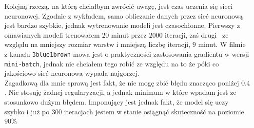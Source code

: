 \documentclass[polish,12pt,a4paper]{extarticle}
\begin{document}
Kolejną rzeczą, na którą chciałbym zwrócić uwagę, jest czas uczenia się sieci neuronowej. Zgodnie z wykładem, samo obliczanie danych przez sieć neuronową jest bardzo szybkie, jednak wytrenowanie modeli jest czasochłonne. Pierwszy z omawianych modeli trenowałem $20$ minut przez $2000$ iteracji, zaś drugi \textendash\, ze względu na mniejszy rozmiar warstw i mniejszą liczbę iteracji, $9$ minut. W filmie z kanału \texttt{3blue1brown} mowa jest o praktyczności zastosowania gradientu w wersji \texttt{mini-batch}, jednak nie chciałem tego robić ze względu na to że póki co jakościowo sieć neuronowa wypada najgorzej. \smallskip \\
Zagadkową dla mnie sprawą jest fakt, że nie mogę zbić błędu znacząco poniżej $0.4$. Nie stosuję żadnej regularyzacji, a jednak minimum w które wpadam jest ze stosunkowo dużym błędem. Imponujący jest jednak fakt, że model się uczy szybko i już po $300$ iteracjach jestem w stanie osiągnąć skuteczność na poziomie $90 \% $
\end{document}
